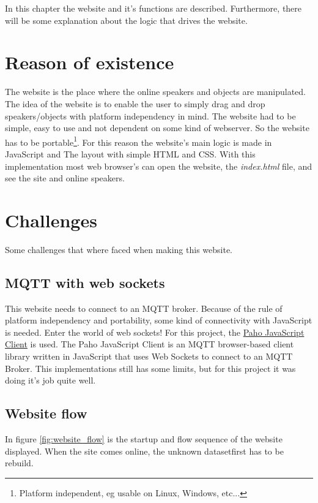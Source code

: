 In this chapter the website and it's functions are described.
Furthermore, there will be some explanation about the logic that drives the website.

\section{Reason of existence}
The website is the place where the online speakers and objects are manipulated.
The idea of the website is to enable the user to simply drag and drop speakers/objects with platform independency in mind.
The website had to be simple, easy to use and not dependent on some kind of webserver.
So the website has to be portable\footnote{Platform independent, eg usable on Linux, Windows, etc...}.
For this reason the website's main logic is made in JavaScript and The layout with simple HTML and CSS.
With this implementation most web browser's can open the website, the \textit{index.html} file, and see the site and online speakers.

\section{Challenges}
Some challenges that where faced when making this website.

\subsection{MQTT with web sockets}
This website needs to connect to an MQTT broker.
Because of the rule of platform independency and portability, some kind of connectivity with JavaScript is needed.
Enter the world of web sockets! For this project, the \href{https://github.com/eclipse/paho.mqtt.javascript}{Paho JavaScript Client} is used.
The Paho JavaScript Client is an MQTT browser-based client library written in JavaScript that uses Web Sockets to connect to an MQTT Broker.
This implementations still has some limits\footnotemark, but for this project it was doing it's job quite well.

\subsection{Website flow}
In figure \ref{fig:website_flow} is the startup and flow sequence of the website displayed.
When the site comes online, the unknown dataset\footnotemark first has to be rebuild.

